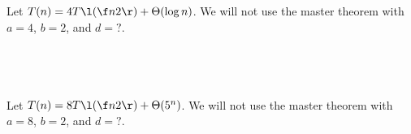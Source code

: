 \documentclass[a4paper]{article}
\begin{document}

\subsection{~}

Let $T(n) = 4T\l(\f n2\r) + \Theta(\log n)$. We will not use the master theorem with $a=4$, $b=2$, and $d=?$.

\subsection{~}

Let $T(n) = 8T\l(\f n2\r) + \Theta(5^n)$. We will not use the master theorem with $a=8$, $b=2$, and $d=?$.






\end{document}
